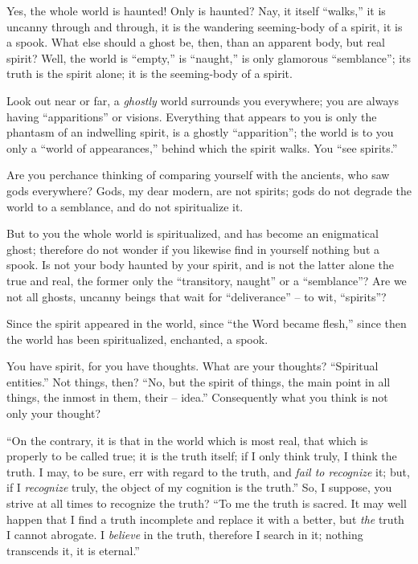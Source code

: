 Yes, the whole world is haunted! Only is haunted? Nay, it itself ``walks,'' 
it is uncanny through and through, it is the wandering seeming-body of a 
spirit, it is a spook. What else should a ghost be, then, than an apparent 
body, but real spirit? Well, the world is ``empty,'' is ``naught,'' is 
only glamorous ``semblance''; its truth is the spirit alone; it is the 
seeming-body of a spirit.

Look out near or far, a \textit{ghostly} world surrounds you everywhere; you 
are always having ``apparitions'' or visions. Everything that appears to you 
is only the phantasm of an indwelling spirit, is a ghostly ``apparition''; 
the world is to you only a ``world of appearances,'' behind which the spirit 
walks. You ``see spirits.''

Are you perchance thinking of comparing yourself with the ancients, who saw 
gods everywhere? Gods, my dear modern, are not spirits; gods do not degrade 
the world to a semblance, and do not spiritualize it.

But to you the whole world is spiritualized, and has become an enigmatical 
ghost; therefore do not wonder if you likewise find in yourself nothing but a 
spook. Is not your body haunted by your spirit, and is not the latter alone 
the true and real, the former only the ``transitory, naught'' or a 
``semblance''? Are we not all ghosts, uncanny beings that wait for 
``deliverance'' -- to wit, ``spirits''?

Since the spirit appeared in the world, since ``the Word became flesh,'' 
since then the world has been spiritualized, enchanted, a spook.

You have spirit, for you have thoughts. What are your thoughts? ``Spiritual 
entities.'' Not things, then? ``No, but the spirit of things, the main point 
in all things, the inmost in them, their -- idea.'' Consequently what you 
think is not only your thought?

``On the contrary, it is that in the world which is most real, that which is 
properly to be called true; it is the truth itself; if I only think truly, I 
think the truth. I may, to be sure, err with regard to the truth, and 
\textit{fail to recognize} it; but, if I \textit{recognize} truly, the object 
of my cognition is the truth.'' So, I suppose, you strive at all times to 
recognize the truth? ``To me the truth is sacred. It may well happen that I 
find a truth incomplete and replace it with a better, but \textit{the} truth I 
cannot abrogate. I \textit{believe} in the truth, therefore I search in it; 
nothing transcends it, it is eternal.''

